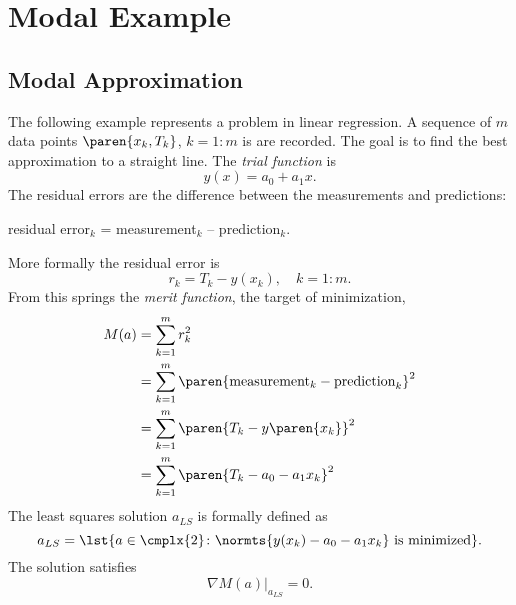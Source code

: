 \chapter{\label{ch:archetype modal}Modal Example}

\section{\label{sec:modal problem}Modal Approximation}  %
The following example represents a problem in linear regression. A sequence of $m$ data points $\paren{x_{k}, T_{k}}$,  $k=1\colon m$  is are recorded. The goal is to find the best approximation to a straight line. The \emph{trial function} is
  \begin{equation*}   %
    y(x) = a_{0} + a_{1} x .
    \label{eq:lr trial}
  \end{equation*}
The residual errors are the difference between the measurements and predictions:\\
\begin{center}
residual error$_{k}$ = measurement$_{k}$ -- prediction$_{k}$.
\end{center} 
 More formally the residual error is
  \begin{equation*}   %
    r_{k} = T_{k} - y(x_{k}), \quad k=1\colon m.
  \end{equation*}
From this springs the \emph{merit function}, the target of minimization,
  \begin{equation}   %
  \begin{split}
    M(a) 
      &= \sum_{k=1}^{m} r_{k}^{2} \\
      &= \sum_{k=1}^{m} \paren{\text{measurement}_{k} - \text{prediction}_{k}}^{2} \\
      &= \sum_{k=1}^{m} \paren{T_{k} - y\paren{x_{k}}}^{2} \\
      &= \sum_{k=1}^{m} \paren{T_{k} - a_{0} - a_{1} x_{k}}^{2}
    \label{eqn:merit}
  \end{split}
  \end{equation}
The least squares solution $a_{LS}$ is formally defined as 
  \begin{equation*}   %
    a_{LS} = \lst{a \in \cmplx{2} \colon \normts{y(x_{k}) - a_{0} - a_{1} x_{k}} \text{ is minimized} }.
  \end{equation*}
The solution satisfies
  \begin{equation}   %
    \nabla M( a )|_{a_{LS}} = 0 .
    \label{eq:gradient lr}
  \end{equation}

